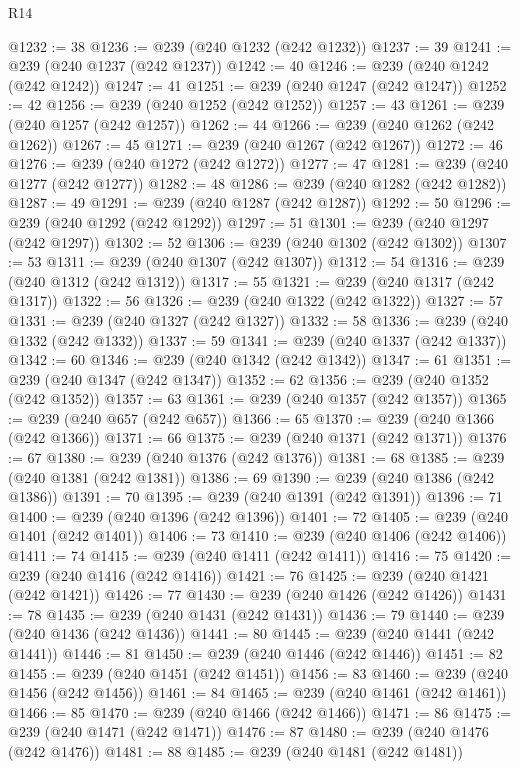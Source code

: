 \begin{lexlean}{R14}
\begin{coremodule}
@1232 := 38
@1236 := @239 (@240 @1232 (@242 @1232))
@1237 := 39
@1241 := @239 (@240 @1237 (@242 @1237))
@1242 := 40
@1246 := @239 (@240 @1242 (@242 @1242))
@1247 := 41
@1251 := @239 (@240 @1247 (@242 @1247))
@1252 := 42
@1256 := @239 (@240 @1252 (@242 @1252))
@1257 := 43
@1261 := @239 (@240 @1257 (@242 @1257))
@1262 := 44
@1266 := @239 (@240 @1262 (@242 @1262))
@1267 := 45
@1271 := @239 (@240 @1267 (@242 @1267))
@1272 := 46
@1276 := @239 (@240 @1272 (@242 @1272))
@1277 := 47
@1281 := @239 (@240 @1277 (@242 @1277))
@1282 := 48
@1286 := @239 (@240 @1282 (@242 @1282))
@1287 := 49
@1291 := @239 (@240 @1287 (@242 @1287))
@1292 := 50
@1296 := @239 (@240 @1292 (@242 @1292))
@1297 := 51
@1301 := @239 (@240 @1297 (@242 @1297))
@1302 := 52
@1306 := @239 (@240 @1302 (@242 @1302))
@1307 := 53
@1311 := @239 (@240 @1307 (@242 @1307))
@1312 := 54
@1316 := @239 (@240 @1312 (@242 @1312))
@1317 := 55
@1321 := @239 (@240 @1317 (@242 @1317))
@1322 := 56
@1326 := @239 (@240 @1322 (@242 @1322))
@1327 := 57
@1331 := @239 (@240 @1327 (@242 @1327))
@1332 := 58
@1336 := @239 (@240 @1332 (@242 @1332))
@1337 := 59
@1341 := @239 (@240 @1337 (@242 @1337))
@1342 := 60
@1346 := @239 (@240 @1342 (@242 @1342))
@1347 := 61
@1351 := @239 (@240 @1347 (@242 @1347))
@1352 := 62
@1356 := @239 (@240 @1352 (@242 @1352))
@1357 := 63
@1361 := @239 (@240 @1357 (@242 @1357))
@1365 := @239 (@240 @657 (@242 @657))
@1366 := 65
@1370 := @239 (@240 @1366 (@242 @1366))
@1371 := 66
@1375 := @239 (@240 @1371 (@242 @1371))
@1376 := 67
@1380 := @239 (@240 @1376 (@242 @1376))
@1381 := 68
@1385 := @239 (@240 @1381 (@242 @1381))
@1386 := 69
@1390 := @239 (@240 @1386 (@242 @1386))
@1391 := 70
@1395 := @239 (@240 @1391 (@242 @1391))
@1396 := 71
@1400 := @239 (@240 @1396 (@242 @1396))
@1401 := 72
@1405 := @239 (@240 @1401 (@242 @1401))
@1406 := 73
@1410 := @239 (@240 @1406 (@242 @1406))
@1411 := 74
@1415 := @239 (@240 @1411 (@242 @1411))
@1416 := 75
@1420 := @239 (@240 @1416 (@242 @1416))
@1421 := 76
@1425 := @239 (@240 @1421 (@242 @1421))
@1426 := 77
@1430 := @239 (@240 @1426 (@242 @1426))
@1431 := 78
@1435 := @239 (@240 @1431 (@242 @1431))
@1436 := 79
@1440 := @239 (@240 @1436 (@242 @1436))
@1441 := 80
@1445 := @239 (@240 @1441 (@242 @1441))
@1446 := 81
@1450 := @239 (@240 @1446 (@242 @1446))
@1451 := 82
@1455 := @239 (@240 @1451 (@242 @1451))
@1456 := 83
@1460 := @239 (@240 @1456 (@242 @1456))
@1461 := 84
@1465 := @239 (@240 @1461 (@242 @1461))
@1466 := 85
@1470 := @239 (@240 @1466 (@242 @1466))
@1471 := 86
@1475 := @239 (@240 @1471 (@242 @1471))
@1476 := 87
@1480 := @239 (@240 @1476 (@242 @1476))
@1481 := 88
@1485 := @239 (@240 @1481 (@242 @1481))

\end{coremodule}
\end{lexlean}
